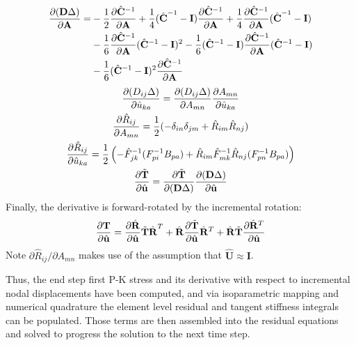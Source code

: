 \begin{equation}
\begin{aligned}
\frac{\partial ({\bf D}\Delta)}{\partial {\bf A}} = &-\frac{1}{2}\frac{\partial {\hat{\bf C}^{-1}}}{\partial \bf A} + \frac{1}{4}({\hat{\bf C}}^{-1} - {\bf I})\frac{\partial \hat{\bf C}^{-1}}{\partial {\bf A}} + \frac{1}{4}\frac{\partial \hat{\bf C}^{-1}}{\partial {\bf A}}({\hat{\bf C}}^{-1} - {\bf I}) \\
&-\frac{1}{6} \frac{\partial {\hat{\bf C}^{-1}}}{\partial \bf A} (\hat{\bf C}^{-1} - {\bf I})^{2} - \frac{1}{6}  (\hat{\bf C}^{-1} - {\bf I}) \frac{\partial {\hat{\bf C}^{-1}}}{\partial \bf A} (\hat{\bf C}^{-1} - {\bf I}) \\
&- \frac{1}{6}(\hat{\bf C}^{-1} - {\bf I})^{2} \frac{\partial {\hat{\bf C}^{-1}}}{\partial \bf A} 
\end{aligned}
\end{equation}
\begin{gather}
\frac{\partial (D_{ij}\Delta)}{\partial \hat{u}_{ka}} = \frac{\partial (D_{ij}\Delta)}{\partial A_{mn}}\frac{\partial A_{mn}}{\partial \hat{u}_{ka}} \\
\frac{\partial \hat{R}_{ij}}{\partial A_{mn}} = \frac{1}{2}(-\delta_{in}\delta_{jm} + \hat{R}_{im}\hat{R}_{nj}) \\
\frac{\partial \hat{R}_{ij}}{\partial \hat{u}_{ka}} = \frac{1}{2}\left(-\hat{F}_{jk}^{-1}(F_{pi}^{-1}B_{pa}) + \hat{R}_{im}\hat{F}_{mk}^{-1}\hat{R}_{nj}(F_{pn}^{-1}B_{pa})\right) \\
\frac{\partial \tilde{\bf T}}{\partial \hat{\bf u}} = \frac{\partial \tilde{\bf T}}{\partial ({\bf D}\Delta)}\frac{\partial ({\bf D}\Delta)}{\partial \hat{\bf u}}
\end{gather}
Finally, the derivative is forward-rotated by the incremental rotation:
\begin{equation}
\frac{\partial {\bf T}}{\partial \hat{\bf u}} = \frac{\partial \hat{\bf R}}{\partial \hat{\bf u}}{\tilde {\bf T}}{\hat{\bf R}}^{T} + {\hat{\bf R}}\frac{\partial \tilde{\bf T}}{\partial \hat{\bf u}}\hat{\bf R}^T + \hat{\bf R}\tilde{\bf T}\frac{\partial \hat{\bf R}^{T}}{\partial \hat{\bf u}}
\end{equation}
Note ${\partial \hat{R}_{ij}}/{\partial A_{mn}}$ makes use of the assumption that $\hat{\mathbf{U}} \approx \mathbf{I}$.

Thus, the end step first P-K stress and its derivative with respect to incremental nodal displacements have been computed, and via isoparametric mapping and numerical quadrature the element level residual and tangent stiffness integrals can be populated. Those terms are then assembled into the residual equations and solved to progress the solution to the next time step.

